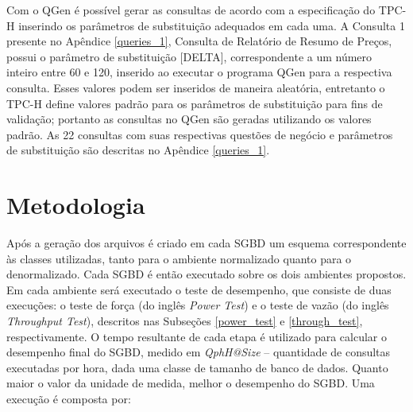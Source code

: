 Com o QGen é possível gerar as consultas de acordo com a especificação do TPC-H inserindo os parâmetros de substituição adequados em cada uma. A Consulta 1 presente no Apêndice \ref{queries_1}, Consulta de Relatório de Resumo de Preços, possui o parâmetro de substituição [DELTA], correspondente a um número inteiro entre 60 e 120, inserido ao executar o programa QGen para a respectiva consulta. Esses valores podem ser inseridos de maneira aleatória, entretanto o TPC-H define valores padrão para os parâmetros de substituição para fins de validação; portanto as consultas no QGen são geradas utilizando os valores padrão. As 22 consultas com suas respectivas questões de negócio e parâmetros de substituição são descritas no Apêndice \ref{queries_1}.

\section{Metodologia}
\label{metodologia}

Após a geração dos arquivos é criado em cada SGBD um esquema correspondente às classes utilizadas, tanto para o ambiente normalizado quanto para o denormalizado. Cada SGBD é então executado sobre os dois ambientes propostos. Em cada ambiente será executado o teste de desempenho, que consiste de duas execuções: o teste de força (do inglês \textit{Power Test}) e o teste de vazão (do inglês \textit{Throughput Test}), descritos nas Subseções \ref{power_test} e \ref{through_test}, respectivamente. O tempo resultante de cada etapa é utilizado para calcular o desempenho final do SGBD, medido em \textit{QphH@Size} -- quantidade de consultas executadas por hora, dada uma classe de tamanho de banco de dados. Quanto maior o valor da unidade de medida, melhor o desempenho do SGBD. Uma execução é composta por:


